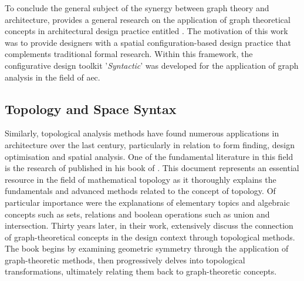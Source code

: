 \documentclass[a4paper, 12pt]{report}
\begin{document}
To conclude the general subject of the synergy between graph theory and architecture, \citeauthor{nourian2016configraphics} provides a general research on the application of graph theoretical concepts in architectural design practice entitled . The motivation of this work was to provide designers with a spatial configuration-based design practice that complements traditional formal research. Within this framework, the configurative design toolkit '\textit{Syntactic}' was developed for the application of graph analysis in the field of \acrshort{aec}.

\subsection{Topology and Space Syntax}\label{subsec:topology-in-architecture}

Similarly, topological analysis methods have found numerous applications in architecture over the last century, particularly in relation to form finding, design optimisation and spatial analysis. One of the fundamental literature in this field is the research of \citeauthor{kelley1955general} published in his book  of \citeyear{kelley1955general}. This document represents an essential resource in the field of mathematical topology as it thoroughly explains the fundamentals and advanced methods related to the concept of topology. Of particular importance were the explanations of elementary topics and algebraic concepts such as sets, relations and \Glspl{boolean operation} such as union and intersection. Thirty years later, \citeauthor{baglivo1983incidence} in their work,  extensively discuss the connection of graph-theoretical concepts in the design context through topological methods. The book begins by examining geometric symmetry through the application of graph-theoretic methods, then progressively delves into topological transformations, ultimately relating them back to graph-theoretic concepts.
\end{document}
